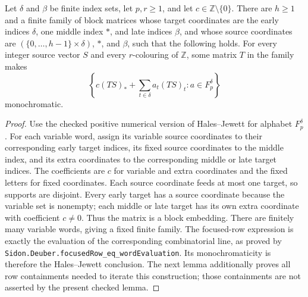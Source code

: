\begin{lemma}
\label{qr:focused-row}
\leanok
{}
Let $\delta$ and $\beta$ be finite index sets, let $p,r\geq1$, and let
$c\in\mathbb Z\setminus\{0\}$.
There are $h\geq1$ and a finite family of block matrices whose target
coordinates are the early indices $\delta$, one middle index $*$, and
late indices $\beta$, and whose source coordinates are
$(\{0,\ldots,h-1\}\times\delta)$, $*$, and $\beta$, such that the
following holds.  For every integer source vector $S$ and every
$r$-colouring of $\mathbb Z$, some matrix $T$ in the family makes
\[
 \left\{c(TS)_*+\sum_{t\in\delta}a_t(TS)_t:a\in F_p^\delta\right\}
\]
monochromatic.
\end{lemma}
\begin{proof}
Use the checked positive numerical version of Hales--Jewett for alphabet
$F_p^\delta$.  For each variable word, assign its variable source
coordinates to their corresponding early target indices, its fixed source
coordinates to the middle index, and its extra coordinates to the
corresponding middle or late target indices.
The coefficients are $c$ for variable and extra coordinates and the fixed
letters for fixed coordinates.
Each source coordinate feeds at most one target, so supports are disjoint.
Every early target has a source coordinate because the variable set is
nonempty; each middle or late target has its own extra coordinate with
coefficient $c\ne0$.  Thus the matrix is a block embedding.
There are finitely many variable words, giving a fixed finite family.
The focused-row expression is exactly the evaluation of the corresponding
combinatorial line, as proved by
\texttt{Sidon.Deuber.focusedRow\_eq\_wordEvaluation}.
Its monochromaticity is therefore the Hales--Jewett conclusion.
The next lemma additionally proves all row containments needed to iterate
this construction; those containments are not asserted by the present
checked lemma.
\end{proof}

